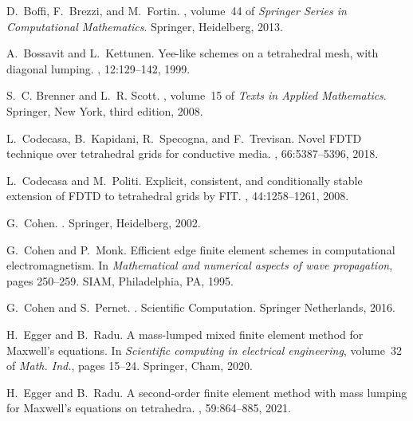 \documentclass[12pt,reqno,a4paper]{amsart}
\theoremstyle{definition}
\begin{document}
\begin{thebibliography}{10}

D.~Boffi, F.~Brezzi, and M.~Fortin.
, volume~44 of
  {\em Springer Series in Computational Mathematics}.
\newblock Springer, Heidelberg, 2013.

A.~Bossavit and L.~Kettunen.
\newblock Yee-like schemes on a tetrahedral mesh, with diagonal lumping.
, 12:129--142, 1999.

S.~C. Brenner and L.~R. Scott.
, volume~15 of
  {\em Texts in Applied Mathematics}.
\newblock Springer, New York, third edition, 2008.

L.~Codecasa, B.~Kapidani, R.~Specogna, and F.~Trevisan.
\newblock Novel {FDTD} technique over tetrahedral grids for conductive media.
, 66:5387--5396,
  2018.

L.~Codecasa and M.~Politi.
\newblock Explicit, consistent, and conditionally stable extension of {FDTD} to
  tetrahedral grids by {FIT}.
, 44:1258--1261, 2008.

G.~Cohen.
.
\newblock Springer, Heidelberg, 2002.

G.~Cohen and P.~Monk.
\newblock Efficient edge finite element schemes in computational
  electromagnetism.
\newblock In {\em Mathematical and numerical aspects of wave propagation},
  pages 250--259. SIAM, Philadelphia, PA, 1995.

G.~Cohen and S.~Pernet.
.
\newblock Scientific Computation. Springer Netherlands, 2016.

H.~Egger and B.~Radu.
\newblock A mass-lumped mixed finite element method for {M}axwell's equations.
\newblock In {\em Scientific computing in electrical engineering}, volume~32 of
  {\em Math. Ind.}, pages 15--24. Springer, Cham, 2020.

H.~Egger and B.~Radu.
\newblock A second-order finite element method with mass lumping for
  {M}axwell's equations on tetrahedra.
, 59:864--885, 2021.


\end{thebibliography}
\end{document}
